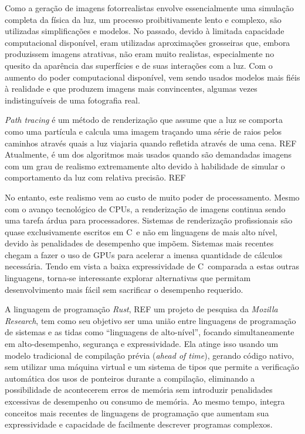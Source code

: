 \documentclass[tg]{mdtufsm}
\def\Cpp{{C\nolinebreak[4]\raisebox{.20ex}{\small\bf++}}}
\newcommand{\todo}[1]{\textsf{\color{red}#1}}
\begin{document}
Como a geração de imagens fotorrealistas envolve essencialmente uma simulação completa da física da
luz, um processo proibitivamente lento e complexo, são utilizadas simplificações e modelos. No
passado, devido à limitada capacidade computacional disponível, eram utilizadas aproximações
grosseiras que, embora produzissem imagens atrativas, não eram muito realistas, especialmente no
quesito da aparência das superfícies e de suas interações com a luz. Com o aumento do poder
computacional disponível, vem sendo usados modelos mais fiéis à realidade e que produzem imagens
mais convincentes, algumas vezes indistinguíveis de uma fotografia real.

\emph{Path tracing} é um método de renderização que assume que a luz se comporta como uma partícula
e calcula uma imagem traçando uma série de raios pelos caminhos através quais a luz viajaria quando
refletida através de uma cena. \todo{REF} Atualmente, é um dos \todo{algoritmos mais usados} quando são demandadas
imagens com um grau de realismo extremamente alto devido à habilidade de simular o
comportamento da luz com relativa precisão. \todo{REF}

No entanto, este realismo vem ao custo de muito poder de processamento. Mesmo com o avanço
tecnológico de CPUs, a renderização de imagens continua sendo uma tarefa árdua para processadores.
Sistemas de renderização profissionais são quase exclusivamente escritos em \Cpp\ e não em
linguagens de mais alto nível, devido às penalidades de desempenho que impõem. Sistemas mais
recentes chegam a fazer o uso de GPUs para acelerar a imensa quantidade de cálculos necessária.
Tendo em vista a baixa expressividade de \Cpp\ comparada a estas outras linguagens, torna-se
interessante explorar alternativas que permitam desenvolvimento mais fácil sem sacrificar o
desempenho requerido.

A linguagem de programação \emph{Rust}, \todo{REF} um projeto de pesquisa da \emph{Mozilla Research}, tem como
seu objetivo ser uma união entre linguagens de programação de sistemas e as tidas como ``linguagens
de alto-nível'', focando simultaneamente em alto-desempenho, segurança e expressividade. Ela atinge
isso usando um modelo tradicional de compilação prévia (\emph{ahead of time}), gerando código nativo,
sem utilizar uma máquina virtual e um sistema de tipos
que permite a verificação automática dos usos de ponteiros durante a compilação, eliminando a
possibilidade de acontecerem erros de memória sem introduzir penalidades excessivas de desempenho
ou consumo de memória. Ao mesmo tempo, integra conceitos mais recentes de linguagens de programação
que aumentam sua expressividade e capacidade de facilmente descrever programas complexos.
\end{document}

